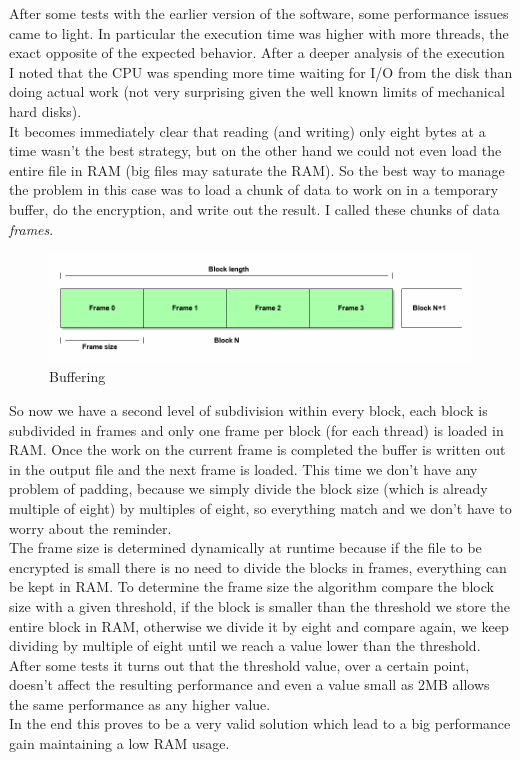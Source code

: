 After some tests with the earlier version of the software, some performance issues came to light. In particular the execution time was higher with more threads, the exact opposite of the expected behavior. After a deeper analysis of the execution I noted that the CPU was spending more time waiting for I/O from the disk than doing actual work (not very surprising given the well known limits of mechanical hard disks).\\
It becomes immediately clear that reading (and writing) only eight bytes at a time wasn't the best strategy, but on the other hand we could not even load the entire file in RAM (big files may saturate the RAM). So the best way to manage the problem in this case was to load a chunk of data to work on in a temporary buffer, do the encryption, and write out the result. I called these chunks of data \emph{frames}.

\begin{figure}[H]
\centering
\includegraphics[scale = 0.4]{./Pictures/buffering} %
\caption{Buffering}
\label{fig:buffering}
\end{figure}

So now we have a second level of subdivision within every block, each block is subdivided in frames and only one frame per block (for each thread) is loaded in RAM. Once the work on the current frame is completed the buffer is written out in the output file and the next frame is loaded. This time we don't have any problem of padding, because we simply divide the block size (which is already multiple of eight) by multiples of eight, so everything match and we don't have to worry about the reminder.\\
The frame size is determined dynamically at runtime because if the file to be encrypted is small there is no need to divide the blocks in frames, everything can be kept in RAM. To determine the frame size the algorithm compare the block size with a given threshold, if the block is smaller than the threshold we store the entire block in RAM, otherwise we divide it by eight and compare again, we keep dividing by multiple of eight until we reach a value lower than the threshold.\\
After some tests it turns out that the threshold value, over a certain point, doesn't affect the resulting performance and even a value small as 2MB allows the same performance as any higher value.\\
In the end this proves to be a very valid solution which lead to a big performance gain maintaining a low RAM usage.